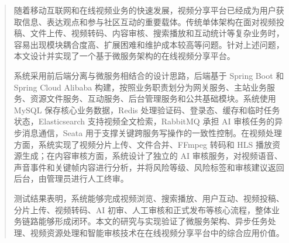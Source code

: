 
\begin{abstract}
随着移动互联网和在线视频业务的快速发展，视频分享平台已经成为用户获取信息、表达观点和参与社区互动的重要载体。传统单体架构在面对视频投稿、文件上传、视频转码、内容审核、搜索播放和互动统计等复杂业务时，容易出现模块耦合度高、扩展困难和维护成本较高等问题。针对上述问题，本文设计并实现了一个基于微服务架构的在线视频分享平台。

系统采用前后端分离与微服务相结合的设计思路，后端基于 Spring Boot 和 Spring Cloud Alibaba 构建，按照业务职责划分为网关服务、主站业务服务、资源文件服务、互动服务、后台管理服务和公共基础模块。系统使用 MySQL 保存核心业务数据，Redis 处理验证码、登录态、缓存和临时任务状态，Elasticsearch 支持视频全文检索，RabbitMQ 承担 AI 审核任务的异步消息通信，Seata 用于支撑关键跨服务写操作的一致性控制。在视频处理方面，系统实现了视频分片上传、文件合并、FFmpeg 转码和 HLS 播放资源生成；在内容审核方面，系统设计了独立的 AI 审核服务，对视频语音、声音事件和关键帧内容进行分析，并将风险等级、风险标签和审核建议返回后台，由管理员进行人工终审。

测试结果表明，系统能够完成视频浏览、搜索播放、用户互动、视频投稿、分片上传、视频转码、AI 初审、人工审核和正式发布等核心流程，整体业务链路能够形成闭环。本文的研究与实现验证了微服务架构、异步任务处理、视频资源处理和智能审核技术在在线视频分享平台中的综合应用价值。

\end{abstract}

